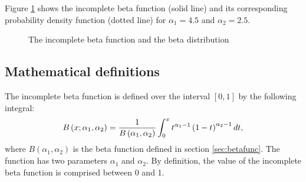 \documentclass[twoside]{book}
\begin{document}
Figure \ref{fig:incBetaFunction} shows the incomplete beta
function (solid line) and its corresponding probability density
function (dotted line) for $\alpha_1=4.5$ and $\alpha_2=2.5$.
\begin{figure}
\center{} \caption{The incomplete beta function and the beta
distribution}\label{fig:incBetaFunction}
\end{figure}

\subsection{Mathematical definitions}
The incomplete beta function is defined over the interval
$\left[0,1\right]$ by the following integral:
\begin{equation}
\label{eq:incBetaFunction}
  B\left(x;\alpha_1,\alpha_2\right)={1\over B\left(\alpha_1,\alpha_2\right)}
  \int_0^x t^{\alpha_1-1}\left(1-t\right)^{\alpha_2-1}dt,
\end{equation}
where $B\left(\alpha_1,\alpha_2\right)$ is the beta function
defined in section \ref{sec:betafunc}. The function has two
parameters $\alpha_1$ and $\alpha_2$. By definition, the value of
the incomplete beta function is comprised between 0 and 1.
\end{document}
